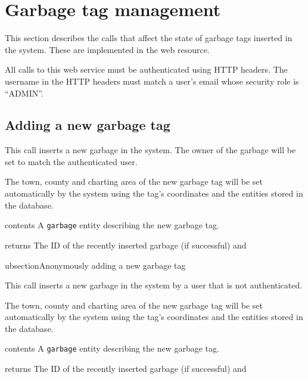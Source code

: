 \section{Garbage tag management}

This section describes the calls that affect the state of garbage tags inserted
in the system. These are implemented in the
 web
resource.

All calls to this web service must be authenticated using HTTP headers. The
username in the HTTP headers must match a user's email whose security role is
``ADMIN''.


\subsection{Adding a new garbage tag}

This call inserts a new garbage in the system. The owner of the garbage will be
set to match the authenticated user.

The town, county and charting area of the new garbage tag will be set
automatically by the system using the tag's coordinates and the entities stored
in the database.

\begin{apidata}{contents}
  A \texttt{garbage} entity describing the new garbage tag.
\end{apidata}
\begin{apidata}{returns}
  The ID of the recently inserted garbage (if successful) and
  \begin{datalist}
  \end{datalist}
\end{apidata}

\s ubsection{Anonymously adding a new garbage tag}

This call inserts a new garbage in the system by a user that is not
authenticated.


The town, county and charting area of the new garbage tag will be set
automatically by the system using the tag's coordinates and the entities stored
in the database.

\begin{apidata}{contents}
  A \texttt{garbage} entity describing the new garbage tag.
\end{apidata}
\begin{apidata}{returns}
  The ID of the recently inserted garbage (if successful) and
  \begin{datalist}
  \end{datalist}
\end{apidata}



